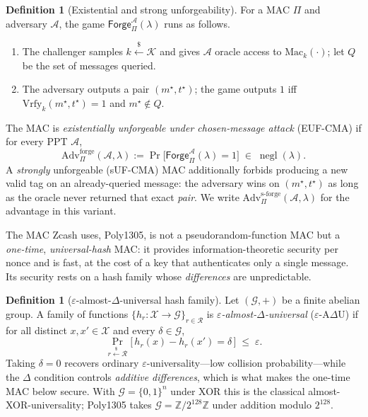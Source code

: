 \documentclass[11pt,a4paper]{article}
\theoremstyle{definition}
\newtheorem{definition}[theorem]{Definition}
\theoremstyle{remark}
\newcommand{\Z}{\ensuremath{\mathbb{Z}}}
\DeclareMathOperator{\negl}{negl}
\begin{document}
\begin{definition}[Existential and strong unforgeability]
\label{symmetric:def-eufcma}
For a MAC \(\Pi\) and adversary \(\mathcal{A}\), the game
\(\mathsf{Forge}^{\mathcal{A}}_{\Pi}(\lambda)\) runs as follows.
\begin{enumerate}
\item The challenger samples \(k \xleftarrow{\$} \mathcal{K}\)
  and gives \(\mathcal{A}\) oracle access to
  \(\mathrm{Mac}_{k}(\cdot)\); let \(Q\) be the set of messages
  queried.
\item The adversary outputs a pair \((m^{\star}, t^{\star})\); the
  game outputs \(1\) iff
  \(\mathrm{Vrfy}_{k}(m^{\star}, t^{\star}) = 1\) and
  \(m^{\star} \notin Q\).
\end{enumerate}
The MAC is \emph{existentially unforgeable under chosen-message
attack} (EUF-CMA) if for every PPT \(\mathcal{A}\),
\[
\mathrm{Adv}^{\mathrm{forge}}_{\Pi}(\mathcal{A}, \lambda)
:= \Pr\bigl[\mathsf{Forge}^{\mathcal{A}}_{\Pi}(\lambda) = 1\bigr]
\;\in\; \negl(\lambda).
\]
A \emph{strongly} unforgeable (sUF-CMA) MAC additionally forbids
producing a new valid tag on an already-queried message: the
adversary wins on \((m^{\star}, t^{\star})\) as long as the oracle
never returned that exact \emph{pair}. We write
\(\mathrm{Adv}^{\mathrm{s\text{-}forge}}_{\Pi}(\mathcal{A}, \lambda)\)
for the advantage in this variant.
\end{definition}

The MAC Zcash uses, \textsf{Poly1305}, is not a
pseudorandom-function MAC but a \emph{one-time},
\emph{universal-hash} MAC: it provides information-theoretic security
per nonce and is fast, at the cost of a key that authenticates only a
single message. Its security rests on a hash family whose
\emph{differences} are unpredictable.

\begin{definition}[\(\varepsilon\)-almost-\(\Delta\)-universal hash
family]\label{symmetric:def-axu}
Let \((\mathcal{G}, +)\) be a finite abelian group. A family of
functions \(\{h_{r} : \mathcal{X} \to \mathcal{G}\}_{r \in
\mathcal{R}}\) is \emph{\(\varepsilon\)-almost-\(\Delta\)-universal}
(\(\varepsilon\)-A\(\Delta\)U) if for all distinct
\(x, x' \in \mathcal{X}\) and every \(\delta \in \mathcal{G}\),
\[
\Pr_{r \xleftarrow{\$} \mathcal{R}}
  \bigl[\, h_{r}(x) - h_{r}(x') = \delta \,\bigr]
\;\le\; \varepsilon.
\]
Taking \(\delta = 0\) recovers ordinary
\(\varepsilon\)-universality---low collision probability---while the
\(\Delta\) condition controls \emph{additive differences}, which is
what makes the one-time MAC below secure. With
\(\mathcal{G} = \{0,1\}^{n}\) under XOR this is the classical
almost-XOR-universality; \textsf{Poly1305} takes
\(\mathcal{G} = \Z/2^{128}\Z\) under addition modulo \(2^{128}\).
\end{definition}
\end{document}
